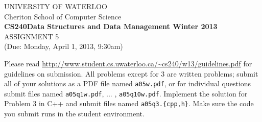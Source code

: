 \documentclass[11pt]{article}
\begin{document}
%
%
\begin{center}
UNIVERSITY OF WATERLOO\\
Cheriton School of Computer Science\\[\baselineskip]
{\bf CS240\hfill Data Structures and Data Management \hfill
Winter 2013}\\[\baselineskip]
{\sc \large ASSIGNMENT 5}\\
(Due: Monday, April 1, 2013, 9:30am)\\[2\baselineskip]
\end{center}
%
%

\noindent


Please read \url{http://www.student.cs.uwaterloo.ca/~cs240/w13/guidelines.pdf} for guidelines on submission. 
All problems except for 3 are written problems; submit all of your solutions as a PDF file named {\tt a05w.pdf}, or for individual questions submit files named {\tt a05q1w.pdf}, ... , {\tt a05q10w.pdf}. 
Implement the solution for Problem 3 in C++ and submit files named {\tt a05q3.\{cpp,h\}}. 
Make sure the code you submit runs in the student environment.
\noindent
\end{document}
